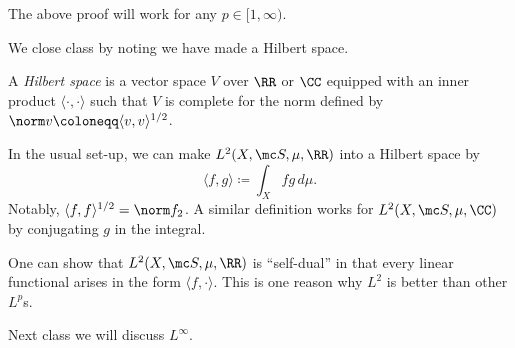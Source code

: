 \documentclass[../notes.tex]{subfiles}
\begin{document}
\begin{remark}
	The above proof will work for any $p\in[1,\infty)$.
\end{remark}
We close class by noting we have made a Hilbert space.
\begin{definition}
	A \textit{Hilbert space} is a vector space $V$ over $\RR$ or $\CC$ equipped with an inner product $\langle\cdot,\cdot\rangle$ such that $V$ is complete for the norm defined by $\norm v\coloneqq\langle v,v\rangle^{1/2}$.
\end{definition}
\begin{example}
	In the usual set-up, we can make $L^2(X,\mc S,\mu,\RR)$ into a Hilbert space by
	\[\langle f,g\rangle\coloneqq\int_Xfg\,d\mu.\]
	Notably, $\langle f,f\rangle^{1/2}=\norm f_2$. A similar definition works for $L^2(X,\mc S,\mu,\CC)$ by conjugating $g$ in the integral.
\end{example}
\begin{remark}
	One can show that $L^2(X,\mc S,\mu,\RR)$ is ``self-dual'' in that every linear functional arises in the form $\langle f,\cdot\rangle$. This is one reason why $L^2$ is better than other $L^p$s.
\end{remark}
Next class we will discuss $L^\infty$.
\end{document}
